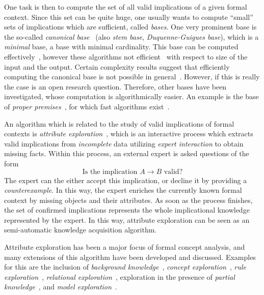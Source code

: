 One task is then to compute the set of all valid implications of a given formal context.
Since this set can be quite huge, one usually wants to compute \enquote{small} sets of
implications which are sufficient, called \emph{bases}.  One very prominent base is the
so-called \emph{canonical base}~\cite{fca:DuquenneGuigues:1986} (also \emph{stem base},
\emph{Duquenne-Guigues base}), which is a \emph{minimal} base, \ie a base with minimal
cardinality.  This base can be computed
effectively~\cite{DBLP:conf/icfca/Ganter10,DBLP:journals/amai/ObiedkovD07}, however these
algorithms not efficient~\cite{DBLP:conf/icfca/Distel10} with respect to size of the input
and the output.  Certain complexity results suggest that efficiently computing the
canonical base is not possible in general~\cite{DBLP:journals/dam/BabinK13}.  However, if
this is really the case is an open research question.  Therefore, other bases have been
investigated, whose computation is algorithmically easier.  An example is the base of
\emph{proper premises}~\cite{fca-book}, for which fast algorithms
exist~\cite{RyDiBo-AMAI13}.

An algorithm which is related to the study of valid implications of formal contexts is
\emph{attribute exploration}~\cite{fca-book,GORS-book}, which is an interactive process
which extracts valid implications from \emph{incomplete} data utilizing \emph{expert
  interaction} to obtain missing facts.  Within this process, an external expert is asked
questions of the form
\begin{equation*}
  \text{Is the implication } A \to B \text{ valid?}
\end{equation*}
The expert can the either accept this implication, or decline it by providing a
\emph{counterexample}.  In this way, the expert enriches the currently known formal
context by missing objects and their attributes.  As soon as the process finishes, the set
of confirmed implications represents the whole implicational knowledge represented by the
expert.  In this way, attribute exploration can be seen as an semi-automatic knowledge
acquisition algorithm.

Attribute exploration has been a major focus of formal concept analysis, and many
extensions of this algorithm have been developed and discussed.  Examples for this are the
inclusion of \emph{background
  knowledge}~\cite{stumme96attribute,DBLP:journals/tcs/Ganter99}, \emph{concept
  exploration}~\cite{conf/iccs/Stumme97}, \emph{rule
  exploration}~\cite{phd/de/Zickwolff1991}, \emph{relational
  exploration}~\cite{rudolph2006relational}, exploration in the presence of \emph{partial
  knowledge}~\cite{DBLP:conf/fca/BurmeisterH05,conf/owled/BaaderGSS07}, and \emph{model
  exploration}~\cite{Diss-Felix}.

